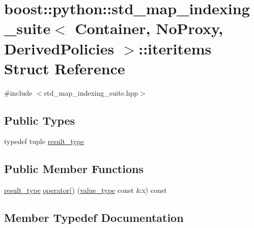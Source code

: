 \hypertarget{structboost_1_1python_1_1std__map__indexing__suite_1_1iteritems}{}\section{boost\+:\+:python\+:\+:std\+\_\+map\+\_\+indexing\+\_\+suite$<$ Container, No\+Proxy, Derived\+Policies $>$\+:\+:iteritems Struct Reference}
\label{structboost_1_1python_1_1std__map__indexing__suite_1_1iteritems}


{\ttfamily \#include $<$std\+\_\+map\+\_\+indexing\+\_\+suite.\+hpp$>$}

\subsection*{Public Types}
\begin{DoxyCompactItemize}
\item 
typedef tuple \hyperlink{structboost_1_1python_1_1std__map__indexing__suite_1_1iteritems_a97f1c788acd4c665fba8ae1fcc946a45}{result\+\_\+type}
\end{DoxyCompactItemize}
\subsection*{Public Member Functions}
\begin{DoxyCompactItemize}
\item 
\hyperlink{structboost_1_1python_1_1std__map__indexing__suite_1_1iteritems_a97f1c788acd4c665fba8ae1fcc946a45}{result\+\_\+type} \hyperlink{structboost_1_1python_1_1std__map__indexing__suite_1_1iteritems_a4adb01be48bc47d6c1636957267fdca2}{operator()} (\hyperlink{classboost_1_1python_1_1std__map__indexing__suite_aff9ed68cf30e805a04a313d92c62ab38}{value\+\_\+type} const \&x) const 
\end{DoxyCompactItemize}


\subsection{Member Typedef Documentation}
\hypertarget{structboost_1_1python_1_1std__map__indexing__suite_1_1iteritems_a97f1c788acd4c665fba8ae1fcc946a45}{}

